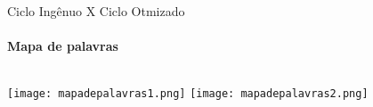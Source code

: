     
\begin{frame}[t]{Ciclo Ingênuo X Ciclo Otmizado}
    \transboxout[duration=0.5]
    \framesubtitle{Mapa de palavras}
    
    \begin{columns}
        \newline  
            \texttt{[image: mapadepalavras1.png]}
        \newline  
         \texttt{[image: mapadepalavras2.png]}
    \end{columns}
    
\end{frame}
